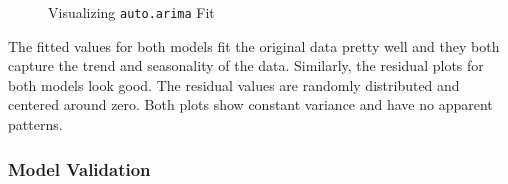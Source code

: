 \documentclass{article}\usepackage[]{graphicx}\usepackage[]{color}
\newenvironment{knitrout}{}{} %
\begin{document}
\begin{knitrout}
\color{fgcolor}\begin{figure}[H]

{\centering {}

}

\caption{Visualizing \texttt{auto.arima} Fit}\label{fig:ts_4}
\end{figure}


\end{knitrout}

The fitted values for both models fit the original data pretty well and they both capture the trend and seasonality of the data. Similarly, the residual plots for both models look good. The residual values are randomly distributed and centered around zero. Both plots show constant variance and have no apparent patterns. 

\subsubsection*{Model Validation}
\end{document}
